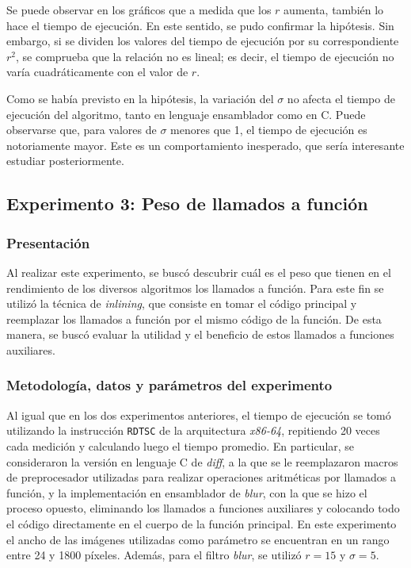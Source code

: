              Se puede observar en los gráficos que a medida que los $r$ aumenta, también lo hace el tiempo de ejecución. En este sentido, se pudo confirmar la hipótesis. Sin embargo, si se dividen los valores del tiempo de ejecución por su correspondiente $r^2$, se comprueba que la relación no es lineal; es decir, el tiempo de ejecución no varía cuadráticamente con el valor de $r$.

            Como se había previsto en la hipótesis, la variación del $\sigma$ no afecta el tiempo de ejecución del algoritmo, tanto en lenguaje ensamblador como en C. Puede observarse que, para valores de $\sigma$ menores que 1, el tiempo de ejecución es notoriamente mayor. Este es un comportamiento inesperado, que sería interesante estudiar posteriormente.

    \subsection{Experimento 3: Peso de llamados a función}

        \subsubsection*{Presentación}
            Al realizar este experimento, se buscó descubrir cuál es el peso que tienen en el rendimiento de los diversos algoritmos los llamados a función. Para este fin se utilizó la técnica de \emph{inlining}, que consiste en tomar el código principal y reemplazar los llamados a función por el mismo código de la función. De esta manera, se buscó evaluar la utilidad y el beneficio de estos llamados a funciones auxiliares. 

        \subsubsection*{Metodología, datos y parámetros del experimento}
            Al igual que en los dos experimentos anteriores, el tiempo de ejecución se tomó utilizando la instrucción \texttt{RDTSC} de la arquitectura \emph{x86-64}, repitiendo 20 veces cada medición y calculando luego el tiempo promedio.
             En particular, se consideraron la versión en lenguaje C de \emph{diff}, a la que se le reemplazaron macros de preprocesador utilizadas para realizar operaciones aritméticas por llamados a función, y la implementación en ensamblador de \emph{blur}, con la que se hizo el proceso opuesto, eliminando los llamados a funciones auxiliares y colocando todo el código directamente en el cuerpo de la función principal.
             En este experimento el ancho de las imágenes utilizadas como parámetro se encuentran en un rango entre 24 y 1800 píxeles. Además, para el filtro \emph{blur}, se utilizó $r = 15$ y $\sigma = 5$.

